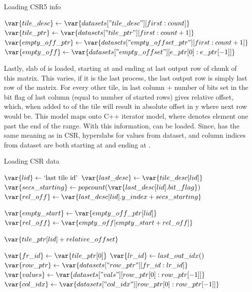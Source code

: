 \documentclass[thesis=M,english]{FITthesis}[2019/12/23]
\begin{document}
\begin{algorithm}
    \caption{Loading CSR5 info}
    \begin{algorithmic}
        \State $\var{tile\_desc} \gets \var{datasets["tile\_desc"][first:count]}$
        \State $\var{tile\_ptr} \gets \var{datasets["tile\_ptr"][first:count+1]}$
        \State $\var{empty\_off\_ptr} \gets \var{datasets["empty\_offset\_ptr"][first:count+1]}$
        \State $\var{empty\_off} \gets \var{datasets["empty\_offset"][e\_ptr[0]:e\_ptr[-1]]}$
        \EndFunction
    \end{algorithmic}
\end{algorithm}

Lastly, slab of  is loaded, starting at  and
ending at last output row of chunk of this matrix. This varies, if it is the last
process, the last output row is simply last row of the matrix. For every other tile,
 in last column + number of bits set in the bit flag of last column
(equal to number of started rows) gives relative offset, which, when added to
 of the tile will result in absolute offset in y where next row would be.
This model maps onto C++ iterator model, where  denotes
element one past the end of the range. With this information,  can be
loaded. Since,  has the same meaning as in CSR, hyperslabs for
values from  dataset, and column indices from  dataset
are both starting at  and ending at .


\begin{algorithm}
    \caption{Loading CSR data}
    \begin{algorithmic}
        \State \(\var{lid} \gets \text{`last tile id'}\)
        \State \(\var{last\_desc} \gets \var{tile\_desc[lid]}\)
        \State \(\var{secs\_starting} \gets popcount(\var{last\_desc[lid].bit\_flag})\)
        \State \(\var{rel\_off} \gets \var{last\_desc[lid].y\_index + secs\_starting}\)

        \State \(\var{empty\_start} \gets \var{empty\_off\_ptr[lid]}\)
        \State \(\var{rel\_off} \gets \var{empty\_off[empty\_start + rel\_off]}\)
        \EndIf

        \Return \(\var{tile\_ptr[lid] + relative\_offset}\)
        \EndFunction

        \State \(\var{fr\_id} \gets \var{tile\_ptr[0]}\)
        \State \(\var{lr\_id} \gets last\_out\_idx()\)
        \State \(\var{row\_ptr} \gets \var{datasets["row\_ptr"][fr\_id:lr\_id]}\)
        \State \(\var{values} \gets \var{datasets["vals"][row\_ptr[0]: row\_ptr[-1]]}\)
        \State \(\var{col\_idx} \gets \var{datasets["col\_idx"][row\_ptr[0]: row\_ptr[-1]]}\)
        \EndFunction
    \end{algorithmic}
\end{algorithm}
\end{document}
